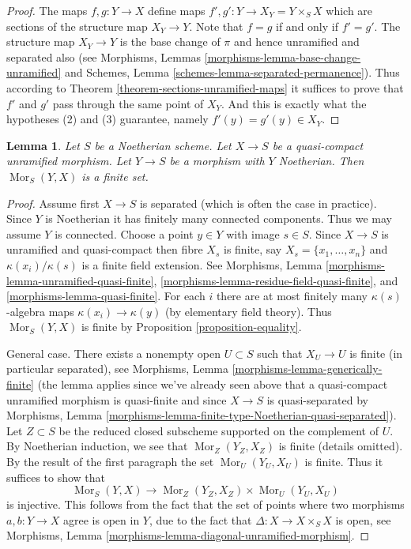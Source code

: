 \documentclass{stacks-project}
\theoremstyle{plain}
\newtheorem{lemma}[subsection]{Lemma}
\theoremstyle{definition}
\theoremstyle{remark}
\numberwithin{equation}{subsection}
\def\Mor{\mathop{\mathrm{Mor}}\nolimits}
\begin{document}
\begin{proof}
The maps $f, g : Y \to X$ define maps $f', g' : Y \to X_Y = Y \times_S X$
which are sections of the structure map $X_Y \to Y$.
Note that $f = g$ if and only if $f' = g'$.
The structure map $X_Y \to Y$ is the base change of $\pi$ and hence
unramified and separated also (see
Morphisms, Lemmas \ref{morphisms-lemma-base-change-unramified} and
Schemes, Lemma \ref{schemes-lemma-separated-permanence}).
Thus according to Theorem \ref{theorem-sections-unramified-maps}
it suffices to prove that $f'$ and $g'$ pass through the same
point of $X_Y$. And this is exactly what the hypotheses (2) and (3)
guarantee, namely $f'(y) = g'(y) \in X_Y$.
\end{proof}

\begin{lemma}
\label{lemma-finitely-many-maps-to-unramified}
Let $S$ be a Noetherian scheme. Let $X \to S$ be a quasi-compact unramified
morphism. Let $Y \to S$ be a morphism with $Y$ Noetherian. Then
$\Mor_S(Y, X)$ is a finite set.
\end{lemma}

\begin{proof}
Assume first $X \to S$ is separated (which is often the case in practice).
Since $Y$ is Noetherian it has finitely many connected components. Thus we
may assume $Y$ is connected. Choose a point $y \in Y$ with image $s \in S$.
Since $X \to S$ is unramified and quasi-compact
then fibre $X_s$ is finite, say $X_s = \{x_1, \ldots, x_n\}$
and $\kappa(x_i)/\kappa(s)$ is a finite field extension.
See Morphisms, Lemma \ref{morphisms-lemma-unramified-quasi-finite},
\ref{morphisms-lemma-residue-field-quasi-finite}, and
\ref{morphisms-lemma-quasi-finite}.
For each $i$ there are at most finitely many $\kappa(s)$-algebra
maps $\kappa(x_i) \to \kappa(y)$ (by elementary field theory).
Thus $\Mor_S(Y, X)$ is finite by
Proposition \ref{proposition-equality}.

\medskip\noindent
General case. There exists a nonempty open $U \subset S$ such
that $X_U \to U$ is finite (in particular separated), see
Morphisms, Lemma \ref{morphisms-lemma-generically-finite}
(the lemma applies since we've already seen above that a quasi-compact
unramified morphism is quasi-finite and since $X \to S$ is quasi-separated by
Morphisms, Lemma \ref{morphisms-lemma-finite-type-Noetherian-quasi-separated}).
Let $Z \subset S$ be the reduced closed subscheme supported on
the complement of $U$. By Noetherian induction, we see that
$\Mor_Z(Y_Z, X_Z)$ is finite (details omitted).
By the result of the first paragraph the set
$\Mor_U(Y_U, X_U)$ is finite. Thus it suffices to show that
$$
\Mor_S(Y, X) \longrightarrow \Mor_Z(Y_Z, X_Z) \times \Mor_U(Y_U, X_U)
$$
is injective. This follows from the fact that the set of points where
two morphisms $a, b : Y \to X$ agree is open in $Y$, due to the fact
that $\Delta : X \to X \times_S X$ is open, see
Morphisms, Lemma \ref{morphisms-lemma-diagonal-unramified-morphism}.
\end{proof}
\end{document}
